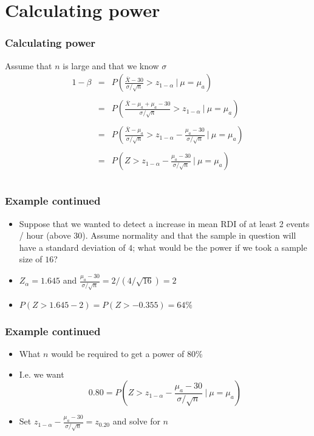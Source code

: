 \documentclass[aspectratio=169]{beamer}
\begin{document}
\section{Calculating power}
\begin{frame}\frametitle{Calculating power} 
Assume that $n$ is large and that we know $\sigma$
\begin{eqnarray*}
1 -\beta & = & 
P\left(\frac{\bar X - 30}{\sigma /\sqrt{n}} > z_{1-\alpha} ~|~ \mu = \mu_a \right)\\ \\
& = & P\left(\frac{\bar X - \mu_a + \mu_a - 30}{\sigma /\sqrt{n}} > z_{1-\alpha} ~|~ \mu = \mu_a \right)\\ \\
& = & P\left(\frac{\bar X - \mu_a}{\sigma /\sqrt{n}} > z_{1-\alpha} - \frac{\mu_a - 30}{\sigma /\sqrt{n}} ~|~ \mu = \mu_a \right)\\ \\
& = & P\left(Z > z_{1-\alpha} - \frac{\mu_a - 30}{\sigma /\sqrt{n}} ~|~ \mu = \mu_a \right)\\ \\
\end{eqnarray*}
\end{frame}

\begin{frame}\frametitle{Example continued}
\begin{itemize}
\item Suppose that we wanted to detect a increase in mean RDI
  of at least 2 events / hour (above 30). Assume normality and
  that the sample in question will have a standard deviation of $4$;
  what would be the power if we took a sample size of $16$? \\
\item $Z_{\alpha} = 1.645$ and $\frac{\mu_a - 30}{\sigma /\sqrt{n}} = 2 / (4 /\sqrt{16}) = 2$ \\
\item $P(Z > 1.645 - 2) = P(Z > -0.355) = 64\%$
\end{itemize}
\end{frame}

\begin{frame}\frametitle{Example continued}
\begin{itemize}
\item What $n$ would be required to get a power of 80\%
\item I.e. we want
$$0.80 = P\left(Z > z_{1-\alpha} - \frac{\mu_a - 30}{\sigma /\sqrt{n}} ~|~ \mu = \mu_a \right)$$
\item Set $z_{1-\alpha} - \frac{\mu_a - 30}{\sigma /\sqrt{n}} = z_{0.20}$ and solve for $n$
\end{itemize}
\end{frame}
\end{document}
